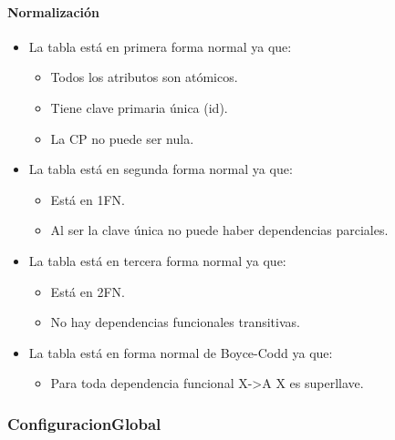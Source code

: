 \documentclass[12pt,a4paperpaper,]{report}
\providecommand{\tightlist}{%
  \setlength{\itemsep}{0pt}\setlength{\parskip}{0pt}}
\let\oldparagraph\paragraph
\renewcommand{\paragraph}[1]{\oldparagraph{#1}\mbox{}}
\begin{document}
\paragraph{Normalización}\label{normalizaciuxf3n-8}

\begin{itemize}
\tightlist
\item
  La tabla está en primera forma normal ya que:

  \begin{itemize}
  \tightlist
  \item
    Todos los atributos son atómicos.
  \item
    Tiene clave primaria única (id).
  \item
    La CP no puede ser nula.
  \end{itemize}
\item
  La tabla está en segunda forma normal ya que:

  \begin{itemize}
  \tightlist
  \item
    Está en 1FN.
  \item
    Al ser la clave única no puede haber dependencias parciales.
  \end{itemize}
\item
  La tabla está en tercera forma normal ya que:

  \begin{itemize}
  \tightlist
  \item
    Está en 2FN.
  \item
    No hay dependencias funcionales transitivas.
  \end{itemize}
\item
  La tabla está en forma normal de Boyce-Codd ya que:

  \begin{itemize}
  \tightlist
  \item
    Para toda dependencia funcional X-\textgreater{}A X es superllave.
  \end{itemize}
\end{itemize}

\subsubsection{ConfiguracionGlobal}\label{configuracionglobal}
\end{document}
